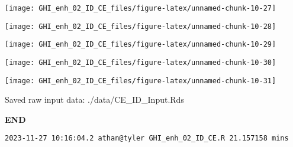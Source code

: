\documentclass[
  10pt,
  a4paper,oneside]{article}
\begin{document}
\begin{center}\texttt{[image: GHI\_enh\_02\_ID\_CE\_files/figure-latex/unnamed-chunk-10-27]} \end{center}

\begin{center}\texttt{[image: GHI\_enh\_02\_ID\_CE\_files/figure-latex/unnamed-chunk-10-28]} \end{center}

\begin{center}\texttt{[image: GHI\_enh\_02\_ID\_CE\_files/figure-latex/unnamed-chunk-10-29]} \end{center}

\begin{center}\texttt{[image: GHI\_enh\_02\_ID\_CE\_files/figure-latex/unnamed-chunk-10-30]} \end{center}

\begin{center}\texttt{[image: GHI\_enh\_02\_ID\_CE\_files/figure-latex/unnamed-chunk-10-31]} \end{center}

Saved raw input data: ./data/CE\_ID\_Input.Rds

\textbf{END}

\begin{verbatim}
2023-11-27 10:16:04.2 athan@tyler GHI_enh_02_ID_CE.R 21.157158 mins
\end{verbatim}
\end{document}
